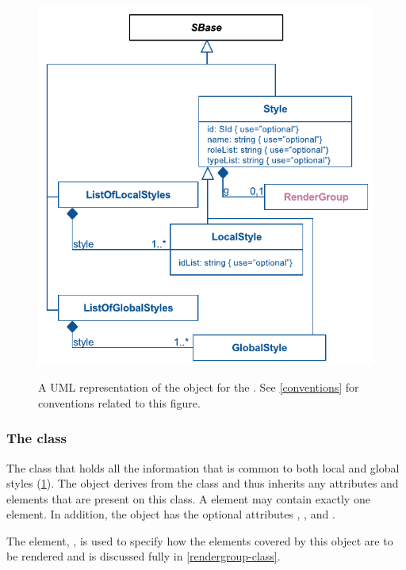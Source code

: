 \begin{figure}[!ht]
  \centering
  \includegraphics{images/render-style-uml}\\
  \caption{A UML representation of the \Style object for the \RenderPackage.
	See \ref{conventions} for conventions related to this figure. }
  \label{fig:style_render_uml}
\end{figure}
\subsubsection{The  class}
\label{style-class}

The \Style class that holds all the information that is common to both local and global styles (\ref{fig:style_render_uml}). The \Style object derives from the \SBase class and thus inherits any
attributes and elements that are present on this class.
A \Style element may contain exactly one \RenderGroup element.
In addition, the \Style object has the optional attributes , ,  and .

The \RenderGroup element, , is used to specify how the elements covered by this \Style object are to be rendered and is discussed fully in \ref{rendergroup-class}. 

